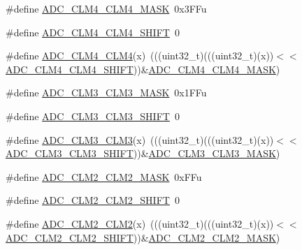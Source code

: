 \begin{DoxyCompactItemize}
\item 
\#define \hyperlink{group___a_d_c___register___masks_ga9f8f5b63268c5b87f04ee884579a385b}{A\+D\+C\+\_\+\+C\+L\+M4\+\_\+\+C\+L\+M4\+\_\+\+M\+A\+SK}~0x3\+F\+Fu
\item 
\#define \hyperlink{group___a_d_c___register___masks_gafa9121fc54ce9386fdc4c1d05f45d0de}{A\+D\+C\+\_\+\+C\+L\+M4\+\_\+\+C\+L\+M4\+\_\+\+S\+H\+I\+FT}~0
\item 
\#define \hyperlink{group___a_d_c___register___masks_gad44edd7b22b26259838f02e5348e2449}{A\+D\+C\+\_\+\+C\+L\+M4\+\_\+\+C\+L\+M4}(x)~(((uint32\+\_\+t)(((uint32\+\_\+t)(x))$<$$<$\hyperlink{group___a_d_c___register___masks_gafa9121fc54ce9386fdc4c1d05f45d0de}{A\+D\+C\+\_\+\+C\+L\+M4\+\_\+\+C\+L\+M4\+\_\+\+S\+H\+I\+FT}))\&\hyperlink{group___a_d_c___register___masks_ga9f8f5b63268c5b87f04ee884579a385b}{A\+D\+C\+\_\+\+C\+L\+M4\+\_\+\+C\+L\+M4\+\_\+\+M\+A\+SK})
\item 
\#define \hyperlink{group___a_d_c___register___masks_ga546b5a27d980deed324add231c050a6f}{A\+D\+C\+\_\+\+C\+L\+M3\+\_\+\+C\+L\+M3\+\_\+\+M\+A\+SK}~0x1\+F\+Fu
\item 
\#define \hyperlink{group___a_d_c___register___masks_ga9bdd0a97bea9576ea5c9eccd54c08940}{A\+D\+C\+\_\+\+C\+L\+M3\+\_\+\+C\+L\+M3\+\_\+\+S\+H\+I\+FT}~0
\item 
\#define \hyperlink{group___a_d_c___register___masks_gaccf9cd66317e1c61f7daacabd0d95904}{A\+D\+C\+\_\+\+C\+L\+M3\+\_\+\+C\+L\+M3}(x)~(((uint32\+\_\+t)(((uint32\+\_\+t)(x))$<$$<$\hyperlink{group___a_d_c___register___masks_ga9bdd0a97bea9576ea5c9eccd54c08940}{A\+D\+C\+\_\+\+C\+L\+M3\+\_\+\+C\+L\+M3\+\_\+\+S\+H\+I\+FT}))\&\hyperlink{group___a_d_c___register___masks_ga546b5a27d980deed324add231c050a6f}{A\+D\+C\+\_\+\+C\+L\+M3\+\_\+\+C\+L\+M3\+\_\+\+M\+A\+SK})
\item 
\#define \hyperlink{group___a_d_c___register___masks_ga815d6f1bf2d38384c8fd0dd4f07f7a08}{A\+D\+C\+\_\+\+C\+L\+M2\+\_\+\+C\+L\+M2\+\_\+\+M\+A\+SK}~0x\+F\+Fu
\item 
\#define \hyperlink{group___a_d_c___register___masks_ga945ed262c088eecda09d679df33ab193}{A\+D\+C\+\_\+\+C\+L\+M2\+\_\+\+C\+L\+M2\+\_\+\+S\+H\+I\+FT}~0
\item 
\#define \hyperlink{group___a_d_c___register___masks_ga2366c7a7142228c95c81d4d11c90b2b1}{A\+D\+C\+\_\+\+C\+L\+M2\+\_\+\+C\+L\+M2}(x)~(((uint32\+\_\+t)(((uint32\+\_\+t)(x))$<$$<$\hyperlink{group___a_d_c___register___masks_ga945ed262c088eecda09d679df33ab193}{A\+D\+C\+\_\+\+C\+L\+M2\+\_\+\+C\+L\+M2\+\_\+\+S\+H\+I\+FT}))\&\hyperlink{group___a_d_c___register___masks_ga815d6f1bf2d38384c8fd0dd4f07f7a08}{A\+D\+C\+\_\+\+C\+L\+M2\+\_\+\+C\+L\+M2\+\_\+\+M\+A\+SK})
$$
\end{DoxyCompactItemize}
